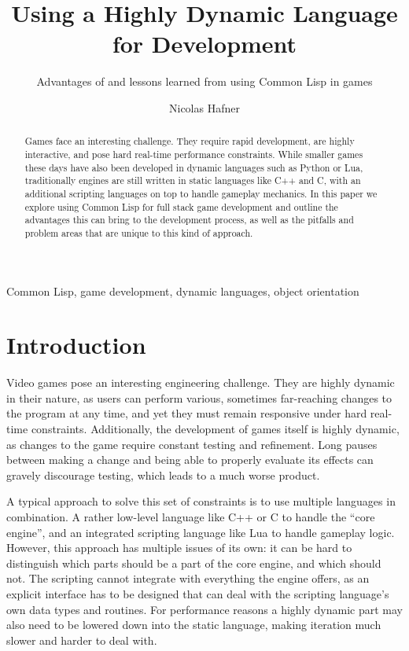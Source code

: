 \documentclass[a4paper]{paper}
\title{Using a Highly Dynamic Language for Development}
\subtitle{Advantages of and lessons learned from using Common Lisp in games}
\author{Nicolas Hafner}
\begin{document}
\twocolumn[\maketitle]

\begin{abstract}
  Games face an interesting challenge. They require rapid development, are highly interactive, and pose hard real-time performance constraints. While smaller games these days have also been developed in dynamic languages such as Python or Lua, traditionally engines are still written in static languages like C++ and C, with an additional scripting languages on top to handle gameplay mechanics. In this paper we explore using Common Lisp for full stack game development and outline the advantages this can bring to the development process, as well as the pitfalls and problem areas that are unique to this kind of approach.
\end{abstract}
\begin{keywords}
  Common Lisp, game development, dynamic languages, object orientation
\end{keywords}

\def\abovecaptionskip{1pt}
\def\listingautorefname{Listing}
\def\figureautorefname{Figure}

\section{Introduction}
Video games pose an interesting engineering challenge. They are highly dynamic in their nature, as users can perform various, sometimes far-reaching changes to the program at any time, and yet they must remain responsive under hard real-time constraints. Additionally, the development of games itself is highly dynamic, as changes to the game require constant testing and refinement. Long pauses between making a change and being able to properly evaluate its effects can gravely discourage testing, which leads to a much worse product.

A typical approach to solve this set of constraints is to use multiple languages in combination. A rather low-level language like C++ or C to handle the ``core engine'', and an integrated scripting language like Lua to handle gameplay logic. However, this approach has multiple issues of its own: it can be hard to distinguish which parts should be a part of the core engine, and which should not. The scripting cannot integrate with everything the engine offers, as an explicit interface has to be designed that can deal with the scripting language's own data types and routines. For performance reasons a highly dynamic part may also need to be lowered down into the static language, making iteration much slower and harder to deal with.
\end{document}
